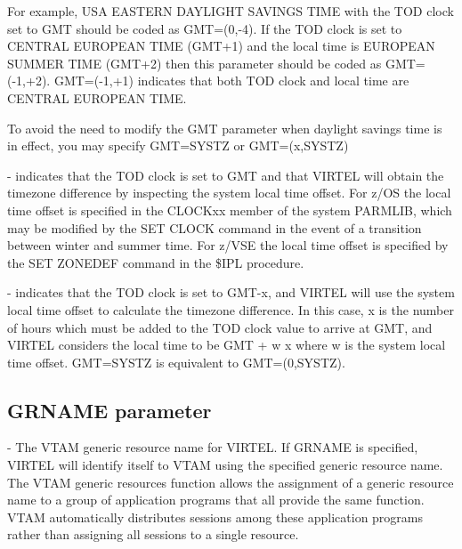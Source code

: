 \documentclass[letterpaper,10pt,english]{sphinxmanual}
\begin{document}
For example, USA EASTERN DAYLIGHT SAVINGS TIME with the TOD clock set to GMT should be coded as GMT=(0,-4). If the TOD clock is set to CENTRAL EUROPEAN TIME (GMT+1) and the local time is EUROPEAN SUMMER TIME (GMT+2) then this parameter should be coded as GMT=(-1,+2). GMT=(-1,+1) indicates that both TOD clock and local time are CENTRAL EUROPEAN TIME.

To avoid the need to modify the GMT parameter when daylight savings time is in effect, you may specify GMT=SYSTZ or GMT=(x,SYSTZ)

 - indicates that the TOD clock is set to GMT and that VIRTEL will obtain the timezone difference by inspecting the system local time offset. For z/OS the local time offset is specified in the CLOCKxx member of the system PARMLIB, which may be modified by the SET CLOCK command in the event of a transition between winter and summer time. For z/VSE the local time offset is specified by the SET ZONEDEF command in the \$IPL procedure.

 - indicates that the TOD clock is set to GMT-x, and VIRTEL will use the system local time offset to calculate the timezone difference. In this case, x is the number of hours which must be added to the TOD clock value to arrive at GMT, and VIRTEL considers the local time to be GMT + w \textendash{} x where w is the system local time offset. GMT=SYSTZ is equivalent to GMT=(0,SYSTZ).


\subsection{GRNAME parameter}
\label{\detokenize{Installation_Guide:grname-parameter}}\label{\detokenize{Installation_Guide:index-68}}
\begin{sphinxVerbatim}[commandchars=\\\{\}]
            
\end{sphinxVerbatim}

 - The VTAM generic resource name for VIRTEL. If GRNAME is specified, VIRTEL will identify itself to VTAM using the specified generic resource name. The VTAM generic resources function allows the assignment of a generic resource name to a group of application programs that all provide the same function. VTAM automatically distributes sessions among these application programs rather than assigning all sessions to a single resource.
\end{document}
